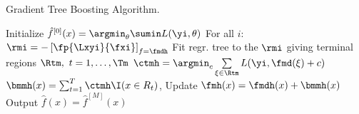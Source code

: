 \begin{algorithm}[H]
  \begin{footnotesize}
  \begin{center}
  \caption{Gradient Tree Boosting Algorithm.}
    \begin{algorithmic}[1]
      \State Initialize $\hat{f}^{[0]}(x) = \argmin_{\theta} \sumin L(\yi, \theta)$
          \State For all $i$: $\rmi = -\left[\fp{\Lxyi}{\fxi}\right]_{f=\fmdh}$
          \State Fit regr. tree to the $\rmi$ giving terminal regions $\Rtm,
          \ t = 1,\ldots,\Tm$
          \State $\ctmh = \argmin_{c} \sum \limits_{\xi \in \Rtm} L(\yi, \fmd(\xi) + c)$
        \EndFor
        \State $\bmmh(x) = \sum_{t=1}^{T} \ctmh \I(x \in R_t) $,
        \State Update $\fmh(x) = \fmdh(x) + \bmmh(x)$
      \EndFor
      \State Output $\hat{f}(x) = \hat{f}^{[M]}(x)$
    \end{algorithmic}
    \end{center}
    \end{footnotesize}
\end{algorithm}
